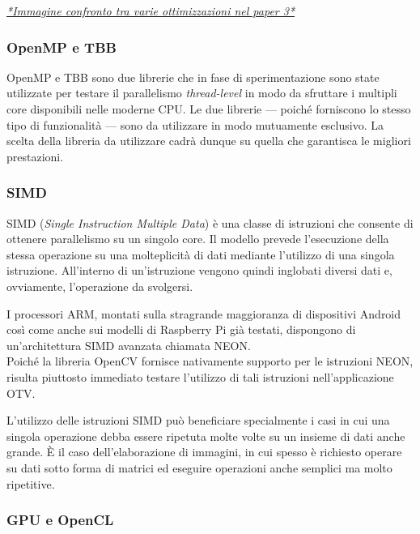\underline{\emph{*Immagine confronto tra varie ottimizzazioni nel paper 3*}}

\subsubsection{OpenMP e TBB}

OpenMP e TBB sono due librerie che in fase di sperimentazione sono state utilizzate per testare il parallelismo
\emph{thread-level} in modo da sfruttare i multipli core disponibili nelle moderne CPU. Le due librerie --- poiché
forniscono lo stesso tipo di funzionalità --- sono da utilizzare in modo mutuamente esclusivo. La scelta della 
libreria da utilizzare cadrà dunque su quella che garantisca le migliori prestazioni.

\subsubsection{SIMD}

SIMD (\textit{Single Instruction Multiple Data}) è una classe di istruzioni che consente di ottenere parallelismo su un
singolo core. Il modello prevede l'esecuzione della stessa operazione su una molteplicità di dati mediante l'utilizzo di una
singola istruzione. All'interno di un'istruzione vengono quindi inglobati diversi dati e, ovviamente, l'operazione da svolgersi.

I processori ARM, montati sulla stragrande maggioranza di dispositivi Android così come anche sui modelli di Raspberry Pi già 
testati, dispongono di un'architettura SIMD avanzata chiamata NEON.\\%
Poiché la libreria OpenCV fornisce nativamente supporto per le istruzioni NEON, risulta piuttosto immediato testare l'utilizzo di
tali istruzioni nell'applicazione OTV.

L'utilizzo delle istruzioni SIMD può beneficiare specialmente i casi in cui una singola operazione debba essere ripetuta molte
volte su un insieme di dati anche grande. È il caso dell'elaborazione di immagini, in cui spesso è richiesto operare su dati sotto
forma di matrici ed eseguire operazioni anche semplici ma molto ripetitive.

\subsubsection{GPU e OpenCL}

